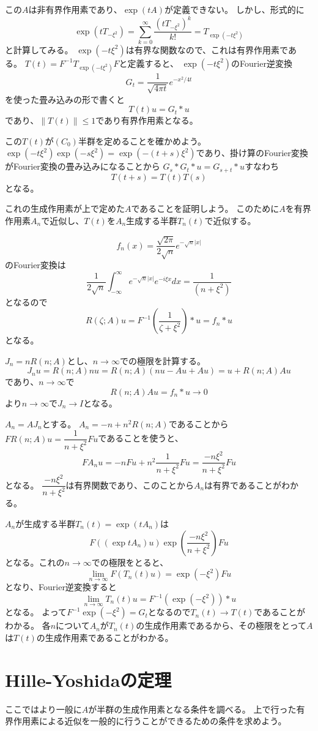 \documentclass{jsarticle}
\newcommand{\abs}[1]{|#1|}
\newcommand{\norm}[1]{\|#1\|}
\begin{document}
この$A$は非有界作用素であり、$\exp(tA)$が定義できない。
しかし、形式的に
\[
\exp(tT_{-\xi^2})=\sum_{k=0}^\infty\frac{(tT_{-\xi^2})^k}{k!}=T_{\exp(-t\xi^2)}
\]
と計算してみる。
$\exp(-t\xi^2)$は有界な関数なので、これは有界作用素である。
$T(t)=F^{-1}T_{\exp(-t\xi^2)}F$と定義すると、
$\exp(-t\xi^2)$のFourier逆変換
\[
G_t=\frac{1}{\sqrt{4\pi t}}e^{-x^2/4t}
\]
を使った畳み込みの形で書くと
\[
T(t)u=G_t*u
\]
であり、$\norm{T(t)}\leq1$であり有界作用素となる。

この$T(t)$が$(C_0)$半群を定めることを確かめよう。
$\exp(-t\xi^2)\exp(-s\xi^2)=\exp(-(t+s)\xi^2)$であり、掛け算のFourier変換がFourier変換の畳み込みになることから
$G_s*G_t*u=G_{s+t}*u$すなわち
\[
T(t+s)=T(t)T(s)
\]
となる。

これの生成作用素が上で定めた$A$であることを証明しよう。
このために$A$を有界作用素$A_n$で近似し、$T(t)$を$A_n$生成する半群$T_n(t)$で近似する。

\[
f_n(x)=\frac{\sqrt{2\pi}}{2\sqrt{n}}e^{-\sqrt{n}\abs{x}}
\]
のFourier変換は
\[
\frac{1}{2\sqrt{n}}\int^\infty_{-\infty}e^{-\sqrt{n}\abs{x}}e^{-i\xi x}dx=\frac{1}{(n+\xi^2)}
\]
となるので
\[
R(\zeta;A)u=F^{-1}(\frac{1}{\zeta+\xi^2})*u=f_n*u
\]
となる。

$J_n=nR(n;A)$とし、$n\to \infty$での極限を計算する。
\[
J_nu=R(n;A)nu=R(n;A)(nu-Au+Au)=u+R(n;A)Au
\]
であり、$n\to\infty$で
\[
R(n;A)Au=f_n*u\to0
\]
より$n\to\infty$で$J_n\to I$となる。

$A_n=AJ_n$とする。
$A_n=-n+n^2R(n;A)$であることから$FR(n;A)u=\dfrac{1}{n+\xi^2}Fu$であることを使うと、
\[
FA_nu=-nFu+n^2\frac{1}{n+\xi^2}Fu=\frac{-n\xi^2}{n+\xi^2}Fu
\]
となる。
$\dfrac{-n\xi^2}{n+\xi^2}$は有界関数であり、このことから$A_n$は有界であることがわかる。

$A_n$が生成する半群$T_n(t)=\exp(tA_n)$は
\[
F((\exp tA_n)u)\exp(\frac{-n\xi^2}{n+\xi^2})Fu
\]
となる。これの$n\to\infty$での極限をとると、
\[
\lim_{n\to\infty}F(T_n(t)u)=\exp(-\xi^2)Fu
\]
となり、Fourier逆変換すると
\[
\lim_{n\to\infty}T_n(t)u=F^{-1}(\exp(-\xi^2))*u
\]
となる。
よって$F^{-1}\exp(-\xi^2)=G_t$となるので$T_n(t)\to T(t)$であることがわかる。
各$n$について$A_n$が$T_n(t)$の生成作用素であるから、その極限をとって$A$は$T(t)$の生成作用素であることがわかる。

\section{Hille-Yoshidaの定理}
ここではより一般に$A$が半群の生成作用素となる条件を調べる。
上で行った有界作用素による近似を一般的に行うことができるための条件を求めよう。
\end{document}
